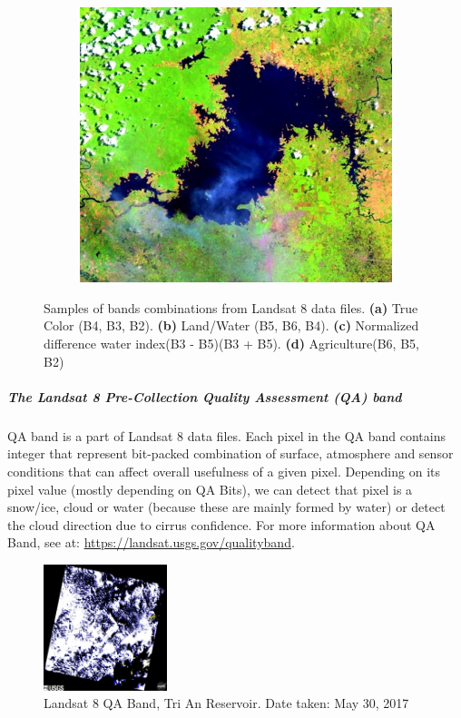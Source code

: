 \begin{figure}
\begin{subfigure}{0.24\textwidth}
		\caption{}
	\end{subfigure}
	\begin{subfigure}{0.24\textwidth}
		\centering
		\includegraphics[width=.8\linewidth]{figures/agriculture.jpg}
		\caption{}
	\end{subfigure}
	\centering
	\caption{Samples of bands combinations from Landsat 8 data files.
		\textbf{(a)} True Color (B4, B3, B2).
		\textbf{(b)} Land/Water (B5, B6, B4).
		\textbf{(c)} Normalized difference water index(B3 - B5)(B3 + B5).
		\textbf{(d)} Agriculture(B6, B5, B2)}
\end{figure}

\subparagraph{The Landsat 8 Pre-Collection Quality Assessment (QA) band}
QA band is a part of Landsat 8 data files. Each pixel in the QA band contains integer that represent bit-packed combination of surface, atmosphere and sensor conditions that can affect overall usefulness of a given pixel. Depending on its pixel value (mostly depending on QA Bits), we can detect that pixel is a snow/ice, cloud or water (because these are mainly formed by water) or detect the cloud direction due to cirrus confidence. For more information about QA Band, see at: \href{https://landsat.usgs.gov/qualityband}{https://landsat.usgs.gov/qualityband}.

\begin{figure}
	\centering
	\includegraphics[width=0.32\textwidth]{figures/qaL8.jpg}
	\caption{Landsat 8 QA Band, Tri An Reservoir. Date taken: May 30, 2017}
\end{figure}

